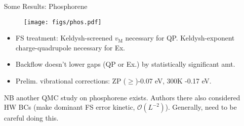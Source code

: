 \documentclass[10pt, pdf, hyperref={draft}, usenames, dvipsnames]{beamer}
\begin{document}
\begin{frame}{Some Results: Phosphorene}

\begin{minipage}[t]{0.45\textwidth}

\begin{figure}[H]
  \centering
  \texttt{[image: figs/phos.pdf]}
\end{figure}

\end{minipage}%
\hfill
\begin{minipage}[t]{0.45\textwidth}

\begin{itemize}

  \item FS treatment: Keldysh-screened $v_{\text{M}}$ necessary for QP.
  Keldysh-exponent charge-quadrupole necessary for Ex.\footnotemark

  \item Backflow doesn't lower gaps (QP or Ex.) by statistically significant
  amt.

  \item Prelim. vibrational corrections: ZP ($\geq$)-0.07 eV, 300K -0.17
  eV.
\end{itemize}

\end{minipage}%
\vfill


NB another QMC study on phosphorene exists. Authors there also considered HW
BCs (make dominant FS error kinetic,
$\mathcal{O}(L^{-2})$). Generally, need to be careful
doing this.
\end{frame}
\end{document}
